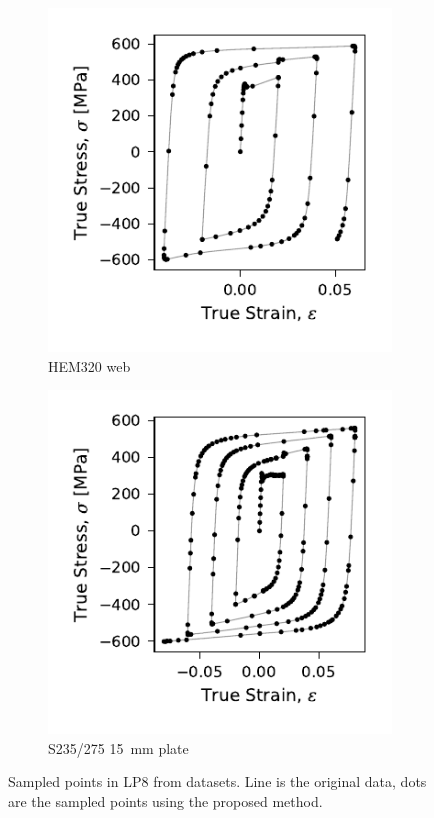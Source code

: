 \documentclass[a4paper,11pt]{article}
\begin{document}
\begin{figure}
    \centering
    \begin{subfigure}[b]{0.49\linewidth}
        \centering
        \includegraphics{LP8_dots_WP3_HEM320_C_CRM20.pdf}
        \caption{HEM320 web}
        \label{fig:hem320-lp8-results}
    \end{subfigure}
    \begin{subfigure}[b]{0.49\linewidth}
        \centering
        \includegraphics{LP8_dots_S235275_Plate15.pdf}
        \caption{S235/275 15~mm plate}
        \label{fig:s235275-lp8-results}
    \end{subfigure}
    \caption{Sampled points in LP8 from datasets. Line is the original data, dots are the sampled points using the proposed method.}
    \label{fig:sampled-compare-dots}
\end{figure}
\end{document}

